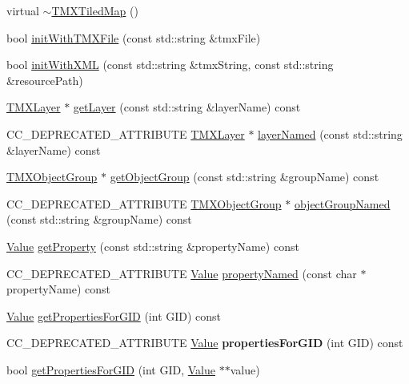 \begin{DoxyCompactItemize}
virtual \hyperlink{classTMXTiledMap_a4a0406798cb65a4a4dde5f667172965c}{$\sim$\+T\+M\+X\+Tiled\+Map} ()
\item 
bool \hyperlink{classTMXTiledMap_a4e75b0b3333616d3898b6119644e4137}{init\+With\+T\+M\+X\+File} (const std\+::string \&tmx\+File)
\item 
bool \hyperlink{classTMXTiledMap_a949cfae17a8c6239e4d433dcae521997}{init\+With\+X\+ML} (const std\+::string \&tmx\+String, const std\+::string \&resource\+Path)
\item 
\hyperlink{classTMXLayer}{T\+M\+X\+Layer} $\ast$ \hyperlink{classTMXTiledMap_a5ed4ea1bd0d798e165e5c60f392343b9}{get\+Layer} (const std\+::string \&layer\+Name) const
\item 
C\+C\+\_\+\+D\+E\+P\+R\+E\+C\+A\+T\+E\+D\+\_\+\+A\+T\+T\+R\+I\+B\+U\+TE \hyperlink{classTMXLayer}{T\+M\+X\+Layer} $\ast$ \hyperlink{classTMXTiledMap_a31f870242ee4c67f871f177d4ac74682}{layer\+Named} (const std\+::string \&layer\+Name) const
\item 
\hyperlink{classTMXObjectGroup}{T\+M\+X\+Object\+Group} $\ast$ \hyperlink{classTMXTiledMap_a98a13b3c2eda3af05814fb859dad8ac1}{get\+Object\+Group} (const std\+::string \&group\+Name) const
\item 
C\+C\+\_\+\+D\+E\+P\+R\+E\+C\+A\+T\+E\+D\+\_\+\+A\+T\+T\+R\+I\+B\+U\+TE \hyperlink{classTMXObjectGroup}{T\+M\+X\+Object\+Group} $\ast$ \hyperlink{classTMXTiledMap_a34f4aaf226d7baf1ad1e44880cf2be14}{object\+Group\+Named} (const std\+::string \&group\+Name) const
\item 
\hyperlink{classValue}{Value} \hyperlink{classTMXTiledMap_a4628b8ea7514e6f12e292b68f8e808ae}{get\+Property} (const std\+::string \&property\+Name) const
\item 
C\+C\+\_\+\+D\+E\+P\+R\+E\+C\+A\+T\+E\+D\+\_\+\+A\+T\+T\+R\+I\+B\+U\+TE \hyperlink{classValue}{Value} \hyperlink{classTMXTiledMap_a27d68f71900e3edd564ce29375c9b911}{property\+Named} (const char $\ast$property\+Name) const
\item 
\hyperlink{classValue}{Value} \hyperlink{classTMXTiledMap_a11c3215d6e74d03d30afc4c693e84d89}{get\+Properties\+For\+G\+ID} (int G\+ID) const
\item 
\mbox{\label{classTMXTiledMap_ab214ca1245f8b65f47aa3dfe41db3c41}} 
C\+C\+\_\+\+D\+E\+P\+R\+E\+C\+A\+T\+E\+D\+\_\+\+A\+T\+T\+R\+I\+B\+U\+TE \hyperlink{classValue}{Value} {\bfseries properties\+For\+G\+ID} (int G\+ID) const
\item 
bool \hyperlink{classTMXTiledMap_a1f7d99f0a15994f45a04a1607545e76e}{get\+Properties\+For\+G\+ID} (int G\+ID, \hyperlink{classValue}{Value} $\ast$$\ast$value)
$$
\end{DoxyCompactItemize}
